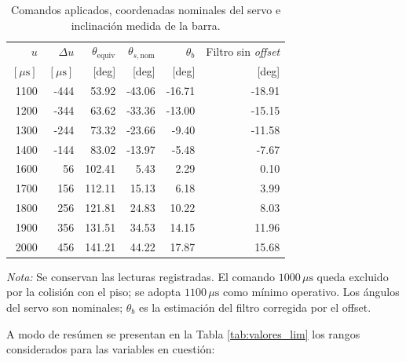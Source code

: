 \documentclass[a4paper, twoside, 10pt, spanish]{article}
\numberwithin{table}{section}
\begin{document}
    \begin{table}[H]
        \centering
        \caption{Comandos aplicados, coordenadas nominales del servo e inclinación medida de la barra.}
        \label{tab:valores_sistema}
        \begingroup
        \small
        \setlength{\tabcolsep}{4pt}
        \begin{tabular}{rrrrrr}
            \toprule
            $u$ & $\Delta u$ & $\theta_{\text{equiv}}$ & $\theta_{s,\text{nom}}$ & $\theta_b$ & Filtro sin \textit{offset} \\
            $[\mu\text{s}]$ & $[\mu\text{s}]$ & [deg] & [deg] & [deg] & [deg] \\
            \midrule
            1100 & -444 & 53.92 & -43.06 & -16.71 & -18.91 \\
            1200 & -344 & 63.62 & -33.36 & -13.00 & -15.15 \\
            1300 & -244 & 73.32 & -23.66 & -9.40 & -11.58 \\
            1400 & -144 & 83.02 & -13.97 & -5.48 & -7.67 \\
            1600 & 56   & 102.41 & 5.43  & 2.29  & 0.10 \\
            1700 & 156  & 112.11 & 15.13 & 6.18  & 3.99 \\
            1800 & 256  & 121.81 & 24.83 & 10.22 & 8.03 \\
            1900 & 356  & 131.51 & 34.53 & 14.15 & 11.96 \\
            2000 & 456  & 141.21 & 44.22 & 17.87 & 15.68 \\
            \bottomrule
        \end{tabular}
        \endgroup
        \par\vspace{2mm}
        {\raggedright\footnotesize\textit{Nota:} Se conservan las lecturas registradas. El comando $1000\,\mu\text{s}$ queda excluido por la colisión con el piso; se adopta $1100\,\mu\text{s}$ como mínimo operativo. Los ángulos del servo son nominales; $\theta_b$ es la estimación del filtro corregida por el offset.\par}
    \end{table}

    A modo de resúmen se presentan en la Tabla \ref{tab:valores_lim} los rangos considerados para las variables en cuestión:
\end{document}
